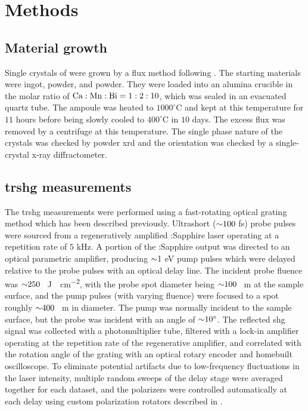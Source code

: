\section{Methods}

\subsection{Material growth}

Single crystals of \cmb were grown by a  flux method following \citet{gibson_magnetic_2015}.
The starting materials were  ingot,  powder, and  powder.
They were loaded into an alumina crucible in the molar ratio of $\ce{Ca}:\ce{Mn}:\ce{Bi} = 1:2:10$, which was sealed in an evacuated quartz tube.
The ampoule was heated to $1000^\circ$\si{C} and kept at this temperature for $11$ hours before being slowly cooled to $400^\circ$\si{C} in $10$ days.
The excess flux was removed by a centrifuge at this temperature.
The single phase nature of the crystals was checked by powder \gls{xrd} and the orientation was checked by a single-crystal x-ray diffractometer.

\subsection{\gls{trshg} measurements}

The \gls{trshg} measurements were performed using a fast-rotating optical grating method which has been described previously\citep{fichera_second_2020, harter_high-speed_2015, torchinsky_low_2014}.
Ultrashort (${\sim} 100$ \si{fs}) probe pulses were sourced from a regeneratively amplified :Sapphire laser operating at a repetition rate of $5$ \si{kHz}.
A portion of the :Sapphire output was directed to an optical parametric amplifier, producing ${\sim} 1$ \si{eV} pump pulses which were delayed relative to the probe pulses with an optical delay line.
The incident probe fluence was ${\sim} 250$ \si{\mu J \cdot cm^{-2}}, with the probe spot diameter being ${\sim} 100$ \si{\mu m} at the sample surface, and the pump pulses (with varying fluence) were focused to a spot roughly ${\sim} 400$ \si{\mu m} in diameter.
The pump was normally incident to the sample surface, but the probe was incident with an angle of ${\sim} 10^\circ$.
The reflected \gls{shg} signal was collected with a photomultiplier tube, filtered with a lock-in amplifier operating at the repetition rate of the regenerative amplifier, and correlated with the rotation angle of the grating with an optical rotary encoder and homebuilt oscilloscope.
To eliminate potential artifacts due to low-frequency fluctuations in the laser intensity, multiple random sweeps of the delay stage were averaged together for each dataset, and the polarizers were controlled automatically at each delay using custom polarization rotators described in \citet{morey_in_prep}.

